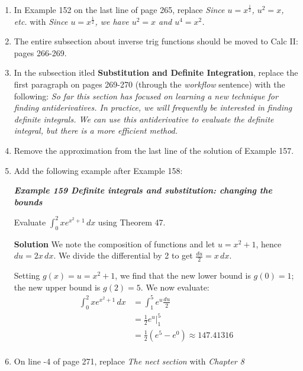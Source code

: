 \documentclass[11pt]{report}
\begin{document}
\begin{enumerate}
\item In Example 152 on the last line of page 265, replace \emph{Since $u=x^{\frac12}$, $u^2=x$, etc.} with \emph{Since $u=x^{\frac12}$, we have $u^2=x$ and $u^4=x^2$.}

\item The entire subsection about inverse trig functions should be moved to Calc II: pages 266-269.

\item In the subsection itled {\bfseries Substitution and Definite Integration}, replace the first paragraph on pages 269-270 (through the \emph{workflow} sentence) with the following: {\slshape So far this section has focused on learning a new technique for finding antiderivatives. In practice, we will frequently be interested in finding definite integrals. We can use this antiderivative to evaluate the definite integral, but there is a more efficient method.}

\item Remove the approximation from the last line of the solution of Example 157.

\item Add the following example after Example 158:

{\slshape {\bfseries Example 159 \qquad Definite integrals and substitution: changing the bounds}

Evaluate $\displaystyle \int_0^2 xe^{x^2+1}\,dx$ using Theorem 47.

{\bfseries Solution} \qquad We note the composition of functions and let $u=x^2+1$, hence $du=2x\,dx$. We divide the differential by 2 to get $\frac{du}2=x\,dx$.

Setting $g(x)=u=x^2+1$, we find that the new lower bound is $g(0)=1$; the new upper bound is $g(2)=5$. We now evaluate:
\begin{equation*}
\begin{split}
\int_0^2 xe^{x^2+1}\,dx &= \int_1^5 e^u \frac{du}2\\
&=\frac12 e^u\biggr|_1^5\\
&=\frac12(e^5-e^0)\approx 147.41316\\
\end{split}
\end{equation*}
}

\item On line -4 of page 271, replace \emph{The nect section} with \emph{Chapter 8}

\end{enumerate}
\end{document}
